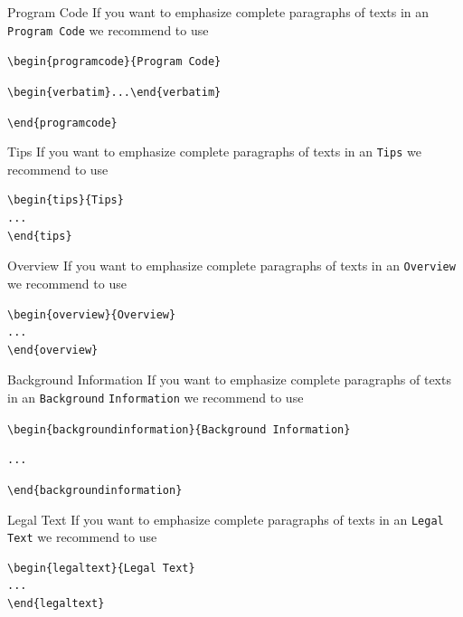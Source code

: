 \begin{programcode}{Program Code}
If you want to emphasize complete paragraphs of texts in an \verb|Program Code| we recommend to
use

\verb|\begin{programcode}{Program Code}|

\verb|\begin{verbatim}...\end{verbatim}|

\verb|\end{programcode}|

\end{programcode}
%
\begin{tips}{Tips}
If you want to emphasize complete paragraphs of texts in an \verb|Tips| we recommend to
use  \begin{verbatim}\begin{tips}{Tips}
...
\end{tips}\end{verbatim}
\end{tips}
\eject
%
\begin{overview}{Overview}
If you want to emphasize complete paragraphs of texts in an \verb|Overview| we recommend to
use  \begin{verbatim}\begin{overview}{Overview}
...
\end{overview}\end{verbatim}
\end{overview}
\begin{backgroundinformation}{Background Information}
If you want to emphasize complete paragraphs of texts in an \verb|Background|
\verb|Information| we recommend to
use

\verb|\begin{backgroundinformation}{Background Information}|

\verb|...|

\verb|\end{backgroundinformation}|
\end{backgroundinformation}
\begin{legaltext}{Legal Text}
If you want to emphasize complete paragraphs of texts in an \verb|Legal Text| we recommend to
use  \begin{verbatim}\begin{legaltext}{Legal Text}
...
\end{legaltext}\end{verbatim}
\end{legaltext}
